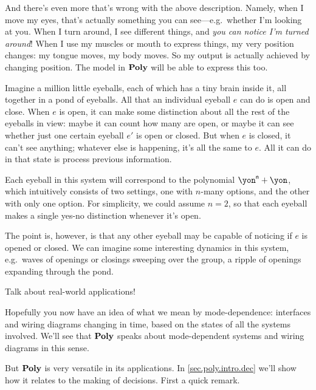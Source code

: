 \documentclass[Book-Poly]{subfiles}
\begin{document}
And there's even more that's wrong with the above description. Namely, when I move my eyes, that's actually something you can see---e.g.\ whether I'm looking at you. When I turn around, I see different things, and \emph{you can notice I'm turned around}! When I use my muscles or mouth to express things, my very position changes: my tongue moves, my body moves. So my output is actually achieved by changing position. The model in $\mathbf{Poly}$ will be able to express this too.

\begin{example}\label{ex.pond_eyeballs}
Imagine a million little eyeballs, each of which has a tiny brain inside it, all together in a pond of eyeballs. All that an individual eyeball $e$ can do is open and close. When $e$ is open, it can make some distinction about all the rest of the eyeballs in view: maybe it can count how many are open, or maybe it can see whether just one certain eyeball $e'$ is open or closed. But when $e$ is closed, it can't see anything; whatever else is happening, it's all the same to $e$. All it can do in that state is process previous information.

Each eyeball in this system will correspond to the polynomial $\yon^\ord{n}+\yon$, which intuitively consists of two settings, one with $n$-many options, and the other with only one option. For simplicity, we could assume $n=2$, so that each eyeball makes a single yes-no distinction whenever it's open.

The point is, however, is that any other eyeball may be capable of noticing if $e$ is opened or closed. We can imagine some interesting dynamics in this system, e.g.\ waves of openings or closings sweeping over the group, a ripple of openings expanding through the pond.

Talk about real-world applications! 
\end{example}

Hopefully you now have an idea of what we mean by mode-dependence: interfaces and wiring diagrams changing in time, based on the states of all the systems involved. We'll see that $\mathbf{Poly}$ speaks about mode-dependent systems and wiring diagrams in this sense. 

But $\mathbf{Poly}$ is very versatile in its applications. In \cref{sec.poly.intro.dec} we'll show how it relates to the making of decisions. First a quick remark.
\end{document}
